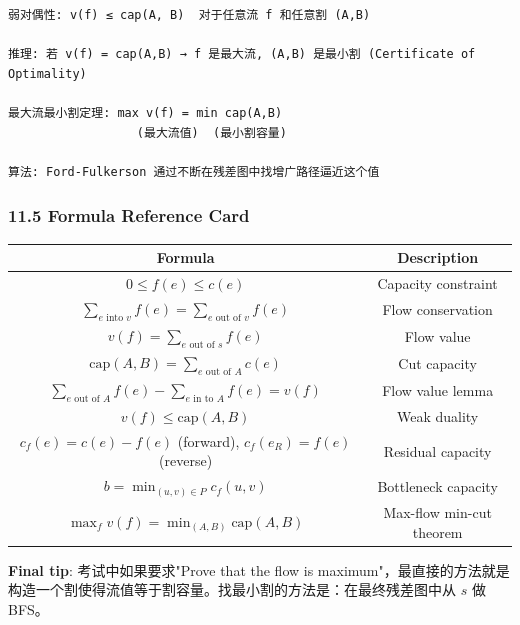 \documentclass[10pt,a4paper,openany]{ctexbook}
\theoremstyle{definition}
\theoremstyle{remark}
\renewenvironment{quote}
  {\list{}{\leftmargin=1em\rightmargin=0pt\topsep=0.5pt\partopsep=0pt}\item[]}
  {\endlist}
\begin{document}
{\footnotesize\begin{verbatim}
弱对偶性: v(f) ≤ cap(A, B)  对于任意流 f 和任意割 (A,B)

推理: 若 v(f) = cap(A,B) → f 是最大流, (A,B) 是最小割 (Certificate of Optimality)

最大流最小割定理: max v(f) = min cap(A,B)
                  (最大流值)  (最小割容量)

算法: Ford-Fulkerson 通过不断在残差图中找增广路径逼近这个值
\end{verbatim}}

\subsubsection{11.5 Formula Reference Card}

\begin{center}
\begin{tabular}{cc}
\hline
Formula & Description \\ \hline
$0 \le f(e) \le c(e)$ & Capacity constraint \\
$\sum_{e \text{ into } v} f(e) = \sum_{e \text{ out of } v} f(e)$ & Flow conservation \\
$v(f) = \sum_{e \text{ out of } s} f(e)$ & Flow value \\
$\text{cap}(A, B) = \sum_{e \text{ out of } A} c(e)$ & Cut capacity \\
$\sum_{e \text{ out of } A} f(e) - \sum_{e \text{ in to } A} f(e) = v(f)$ & Flow value lemma \\
$v(f) \le \text{cap}(A, B)$ & Weak duality \\
$c_f(e) = c(e) - f(e)$ (forward), $c_f(e_R) = f(e)$ (reverse) & Residual capacity \\
$b = \min_{(u,v) \in P} c_f(u, v)$ & Bottleneck capacity \\
$\max_f v(f) = \min_{(A,B)} \text{cap}(A, B)$ & Max-flow min-cut theorem \\
\hline
\end{tabular}

\end{center}

\vspace{-2pt}

\begin{quote}
\textbf{Final tip}: 考试中如果要求"Prove that the flow is maximum"，最直接的方法就是构造一个割使得流值等于割容量。找最小割的方法是：在最终残差图中从 $s$ 做 BFS。

\end{quote}
\end{document}
